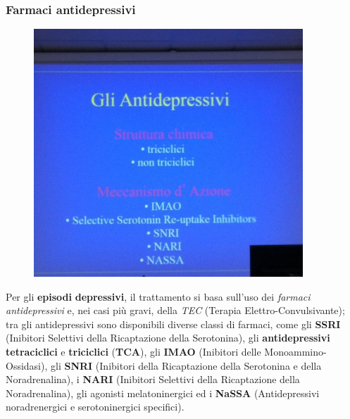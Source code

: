 \subsubsection{Farmaci antidepressivi}

\begin{figure}[!ht]
\centering
	\includegraphics[width=0.9\textwidth]{03/image1.jpeg}
\end{figure}

Per gli \textbf{episodi} \textbf{depressivi}, il trattamento si basa
sull'uso dei \emph{farmaci antidepressivi} e, nei casi più gravi, della
\emph{TEC} (Terapia Elettro-Convulsivante); tra gli antidepressivi sono
disponibili diverse classi di farmaci, come gli \textbf{SSRI} (Inibitori
Selettivi della Ricaptazione della Serotonina), gli
\textbf{antidepressivi tetraciclici} e \textbf{triciclici}
(\textbf{TCA}), gli \textbf{IMAO} (Inibitori delle Monoammino-Ossidasi),
gli \textbf{SNRI} (Inibitori della Ricaptazione della Serotonina e della
Noradrenalina), i \textbf{NARI} (Inibitori Selettivi della Ricaptazione
della Noradrenalina), gli agonisti melatoninergici ed i \textbf{NaSSA}
(Antidepressivi noradrenergici e serotoninergici specifici).

